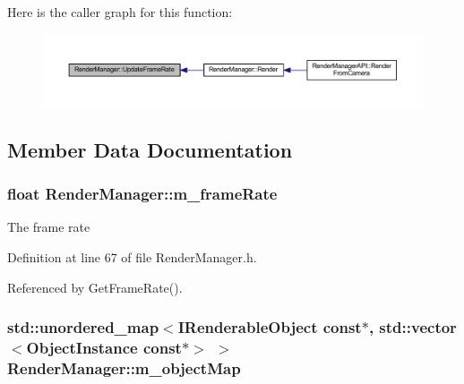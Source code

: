 Here is the caller graph for this function\+:
\nopagebreak
\begin{figure}[H]
\begin{center}
\leavevmode
\includegraphics[width=350pt]{class_render_manager_a85483a27c84d7e11ea6bf12bfd984f28_icgraph}
\end{center}
\end{figure}




\subsection{Member Data Documentation}
\subsubsection[{\texorpdfstring{m\+\_\+frame\+Rate}{m_frameRate}}]{\setlength{\rightskip}{0pt plus 5cm}float Render\+Manager\+::m\+\_\+frame\+Rate\hspace{0.3cm}{\ttfamily [private]}}\hypertarget{class_render_manager_a1b06336967c14318a066f68328944dd2}{}\label{class_render_manager_a1b06336967c14318a066f68328944dd2}


The frame rate 



Definition at line 67 of file Render\+Manager.\+h.



Referenced by Get\+Frame\+Rate().

\subsubsection[{\texorpdfstring{m\+\_\+object\+Map}{m_objectMap}}]{\setlength{\rightskip}{0pt plus 5cm}std\+::unordered\+\_\+map$<${\bf I\+Renderable\+Object} const$\ast$, std\+::vector$<${\bf Object\+Instance} const$\ast$$>$ $>$ Render\+Manager\+::m\+\_\+object\+Map\hspace{0.3cm}{\ttfamily [private]}}\hypertarget{class_render_manager_a704122d9533952be089eb5bab7892740}{}\label{class_render_manager_a704122d9533952be089eb5bab7892740}


